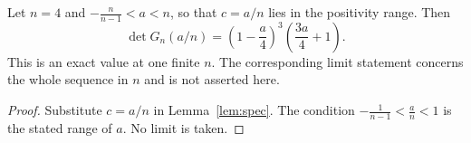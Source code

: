 \begin{theorem}\label{thm:main}
Let $n=4$ and $-\tfrac{n}{n-1}<a<n$, so that $c=a/n$ lies in the positivity range. Then
\[
\det G_n(a/n)=\left(1 - \frac{a}{4}\right)^{3} \left(\frac{3 a}{4} + 1\right).
\]
This is an exact value at one finite $n$. The corresponding limit statement concerns the whole sequence in $n$ and is not asserted here.
\end{theorem}
\begin{proof}
Substitute $c=a/n$ in Lemma~\ref{lem:spec}.
The condition $-\frac1{n-1}<\frac an<1$ is the stated range of $a$.
No limit is taken.
\end{proof}
